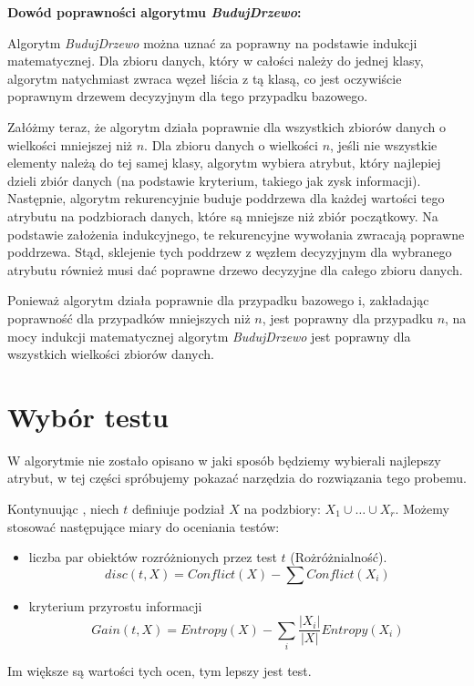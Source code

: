 \documentclass[12pt]{article}
\theoremstyle{definition}
\theoremstyle{definition}
\begin{document}
\textbf{Dowód poprawności algorytmu \textit{BudujDrzewo}:}

Algorytm \textit{BudujDrzewo} można uznać za poprawny na podstawie indukcji matematycznej. Dla zbioru danych, który w całości należy do jednej klasy, algorytm natychmiast zwraca węzeł liścia z tą klasą, co jest oczywiście poprawnym drzewem decyzyjnym dla tego przypadku bazowego.

Załóżmy teraz, że algorytm działa poprawnie dla wszystkich zbiorów danych o wielkości mniejszej niż $n$. Dla zbioru danych o wielkości $n$, jeśli nie wszystkie elementy należą do tej samej klasy, algorytm wybiera atrybut, który najlepiej dzieli zbiór danych (na podstawie kryterium, takiego jak zysk informacji). Następnie, algorytm rekurencyjnie buduje poddrzewa dla każdej wartości tego atrybutu na podzbiorach danych, które są mniejsze niż zbiór początkowy. Na podstawie założenia indukcyjnego, te rekurencyjne wywołania zwracają poprawne poddrzewa. Stąd, sklejenie tych poddrzew z węzłem decyzyjnym dla wybranego atrybutu również musi dać poprawne drzewo decyzyjne dla całego zbioru danych.

Ponieważ algorytm działa poprawnie dla przypadku bazowego i, zakładając poprawność dla przypadków mniejszych niż $n$, jest poprawny dla przypadku $n$, na mocy indukcji matematycznej algorytm \textit{BudujDrzewo} jest poprawny dla wszystkich wielkości zbiorów danych.

\section{Wybór testu}
W algorytmie nie zostało opisano w jaki sposób będziemy wybierali najlepszy atrybut, w tej części spróbujemy pokazać narzędzia do rozwiązania tego probemu. 

Kontynuując \cite{felicjawsi}, niech $t$ definiuje podział $X$ na podzbiory: $X_1 \cup \ldots \cup X_r$. Możemy stosować następujące miary do oceniania testów:
    \begin{itemize}
        \item liczba par obiektów rozróżnionych przez test $t$ (Rożróżnialność).
        \[
        disc(t,X) = Conflict(X) - \sum Conflict(X_i)
        \]
        \item kryterium przyrostu informacji
        \[
        Gain(t,X)=Entropy(X) - \sum_i \frac{|X_i|}{|X|}Entropy(X_i)
        \]
    \end{itemize}

    Im większe są wartości tych ocen, tym lepszy jest test.
\end{document}
